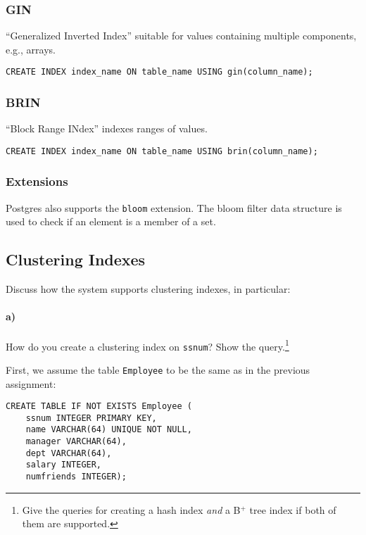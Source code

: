 \documentclass[11pt]{scrartcl}
\begin{document}
\subsubsection*{GIN \cite{PostgreSQL2024IndexTypes} \cite{PostgreSQL2024GistGin}}
\enquote{Generalized Inverted Index} suitable for values containing multiple components, e.g., arrays.
\begin{lstlisting}[style=dbtsql]
CREATE INDEX index_name ON table_name USING gin(column_name);
\end{lstlisting}

\subsubsection*{BRIN \cite{PostgreSQL2024IndexTypes}}
\enquote{Block Range INdex} indexes ranges of values.
\begin{lstlisting}[style=dbtsql]
CREATE INDEX index_name ON table_name USING brin(column_name);
\end{lstlisting}

\subsubsection*{Extensions \cite{PostgreSQL2024Bloom}}
Postgres also supports the \texttt{bloom} extension.
The bloom filter data structure is used to check if an element is a member of a set.

\subsection{Clustering Indexes}

Discuss how the system supports clustering indexes, in particular:

\paragraph{a)}

How do you create a clustering index on \texttt{ssnum}? Show the query.\footnote{Give the queries for creating a hash index \emph{and} a B$^+$ tree index if both of them are supported.}

First, we assume the table \texttt{Employee} to be the same as in the previous assignment:
\begin{lstlisting}[style=dbtsql]
CREATE TABLE IF NOT EXISTS Employee (
    ssnum INTEGER PRIMARY KEY,
    name VARCHAR(64) UNIQUE NOT NULL,
    manager VARCHAR(64),
    dept VARCHAR(64),
    salary INTEGER,
    numfriends INTEGER);
\end{lstlisting}
\end{document}
